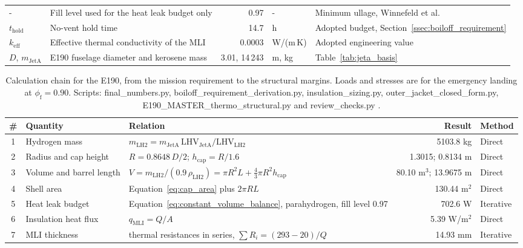 \begin{table}[!htbp]
\begin{tabularx}{\textwidth}{@{}llrl>{\raggedright\arraybackslash}X@{}}
- & Fill level used for the heat leak budget only & 0.97 & - & Minimum ullage, Winnefeld et al.\ \cite{ref12} \\
$t_{\mathrm{hold}}$ & No-vent hold time & 14.7 & h & Adopted budget, Section~\ref{ssec:boiloff_requirement} \\
$k_{\mathrm{eff}}$ & Effective thermal conductivity of the MLI & 0.0003 & W/(m\,K) & Adopted engineering value \\
$D$, $m_{\mathrm{JetA}}$ & E190 fuselage diameter and kerosene mass & 3.01, 14\,243 & m, kg & Table~\ref{tab:jeta_basis} \\
\bottomrule
\end{tabularx}
\end{table}

\begin{table}[!htbp]
\centering
\caption[Calculation chain for the E190]{Calculation chain for the E190, from the mission requirement to the structural margins. Loads and stresses are for the emergency landing at $\phi_{\mathrm{f}} = 0.90$. Scripts: final\_numbers.py, boiloff\_requirement\_derivation.py, insulation\_sizing.py, outer\_jacket\_closed\_form.py, E190\_MASTER\_\allowbreak thermo\_\allowbreak structural.py and review\_checks.py \cite{ref32}.}
\label{tab:app_chain}
\footnotesize
\setlength{\tabcolsep}{3pt}
\begin{tabularx}{\textwidth}{@{}c>{\raggedright\arraybackslash}p{3.0cm}>{\raggedright\arraybackslash}X r l@{}}
\toprule
\# & Quantity & Relation & Result & Method \\
\midrule
1 & Hydrogen mass & $m_{\mathrm{LH2}} = m_{\mathrm{JetA}}\,\mathrm{LHV}_{\mathrm{JetA}}/\mathrm{LHV}_{\mathrm{LH2}}$ & 5103.8 kg & Direct \\
2 & Radius and cap height & $R = 0.8648\,D/2$; $h_{\mathrm{cap}} = R/1.6$ & 1.3015; 0.8134 m & Direct \\
3 & Volume and barrel length & $V = m_{\mathrm{LH2}}/(0.9\,\rho_{\mathrm{LH2}}) = \pi R^2 L + \tfrac{4}{3}\pi R^2 h_{\mathrm{cap}}$ & 80.10 m$^3$; 13.9675 m & Direct \\
4 & Shell area & Equation~\eqref{eq:cap_area} plus $2\pi R L$ & 130.44 m$^2$ & Direct \\
5 & Heat leak budget & Equation~\eqref{eq:constant_volume_balance}, parahydrogen, fill level 0.97 & 702.6 W & Iterative \\
6 & Insulation heat flux & $q_{\mathrm{MLI}} = Q/A$ & 5.39 W/m$^2$ & Direct \\
7 & MLI thickness & thermal resistances in series, $\sum R_i = (293 - 20)/Q$ & 14.93 mm & Iterative \\

\end{tabularx}
\end{table}
